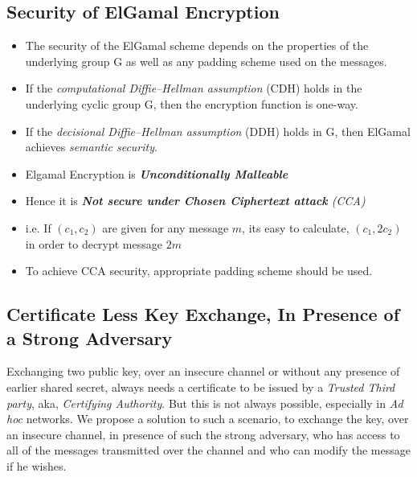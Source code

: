 \documentclass[12pt]{article}
\begin{document}
%
%
%

\subsection{Security of ElGamal Encryption}
\begin{itemize}

\item The security of the ElGamal scheme depends on the properties of the underlying group G as well as any padding scheme used on the messages.
\item If the \textit{computational Diffie–Hellman assumption} (CDH) holds in the underlying cyclic group G, then the encryption function is one-way.
\item If the \textit{decisional Diffie–Hellman assumption} (DDH) holds in G, then ElGamal achieves \textit{semantic security}.
\item Elgamal Encryption is \textit{\textbf{Unconditionally Malleable}}
\item Hence it is \textit{\textbf{Not secure under Chosen Ciphertext attack} (CCA)}
\item i.e. If $(c_1, c_2)$ are given for any message \(m\), its easy to calculate, $(c_1, 2c_2)$ in order to 
decrypt message $2m$
\item To achieve CCA security, appropriate padding scheme should be used.
\end{itemize}








%
%


\pagebreak
\vspace*{\fill}
\begin{center}
\section{Certificate Less Key Exchange, In Presence of a Strong Adversary}
Exchanging two public key, over an insecure channel or without any presence of earlier shared secret, 
always needs a certificate to be issued by a \textit{Trusted Third party}, aka, \textit{Certifying Authority}.
But this is not always possible, especially in \textit{Ad hoc} networks. We propose a solution to such a 
scenario, to exchange the key, over an insecure channel, in presence of such the strong adversary, who has 
access to all of the messages transmitted over the channel and who can modify the message if he wishes.
\end{center}
\vspace*{\fill}
\pagebreak
\end{document}
